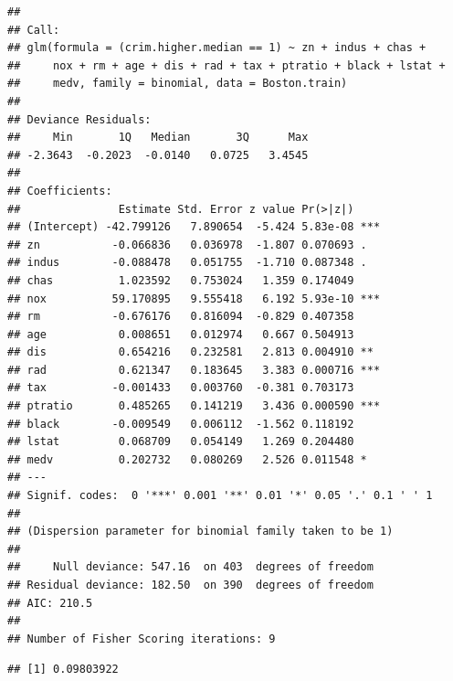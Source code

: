 \documentclass[]{article}
\newenvironment{Shaded}{\begin{snugshade}}{\end{snugshade}}
\newcommand{\KeywordTok}[1]{\textcolor[rgb]{0.13,0.29,0.53}{\textbf{#1}}}
\newcommand{\DataTypeTok}[1]{\textcolor[rgb]{0.13,0.29,0.53}{#1}}
\newcommand{\DecValTok}[1]{\textcolor[rgb]{0.00,0.00,0.81}{#1}}
\newcommand{\FloatTok}[1]{\textcolor[rgb]{0.00,0.00,0.81}{#1}}
\newcommand{\StringTok}[1]{\textcolor[rgb]{0.31,0.60,0.02}{#1}}
\newcommand{\OperatorTok}[1]{\textcolor[rgb]{0.81,0.36,0.00}{\textbf{#1}}}
\newcommand{\NormalTok}[1]{#1}
\begin{document}
\begin{verbatim}
## 
## Call:
## glm(formula = (crim.higher.median == 1) ~ zn + indus + chas + 
##     nox + rm + age + dis + rad + tax + ptratio + black + lstat + 
##     medv, family = binomial, data = Boston.train)
## 
## Deviance Residuals: 
##     Min       1Q   Median       3Q      Max  
## -2.3643  -0.2023  -0.0140   0.0725   3.4545  
## 
## Coefficients:
##               Estimate Std. Error z value Pr(>|z|)    
## (Intercept) -42.799126   7.890654  -5.424 5.83e-08 ***
## zn           -0.066836   0.036978  -1.807 0.070693 .  
## indus        -0.088478   0.051755  -1.710 0.087348 .  
## chas          1.023592   0.753024   1.359 0.174049    
## nox          59.170895   9.555418   6.192 5.93e-10 ***
## rm           -0.676176   0.816094  -0.829 0.407358    
## age           0.008651   0.012974   0.667 0.504913    
## dis           0.654216   0.232581   2.813 0.004910 ** 
## rad           0.621347   0.183645   3.383 0.000716 ***
## tax          -0.001433   0.003760  -0.381 0.703173    
## ptratio       0.485265   0.141219   3.436 0.000590 ***
## black        -0.009549   0.006112  -1.562 0.118192    
## lstat         0.068709   0.054149   1.269 0.204480    
## medv          0.202732   0.080269   2.526 0.011548 *  
## ---
## Signif. codes:  0 '***' 0.001 '**' 0.01 '*' 0.05 '.' 0.1 ' ' 1
## 
## (Dispersion parameter for binomial family taken to be 1)
## 
##     Null deviance: 547.16  on 403  degrees of freedom
## Residual deviance: 182.50  on 390  degrees of freedom
## AIC: 210.5
## 
## Number of Fisher Scoring iterations: 9
\end{verbatim}

\begin{Shaded}
\end{Shaded}

\begin{verbatim}
## [1] 0.09803922
\end{verbatim}
\end{document}
